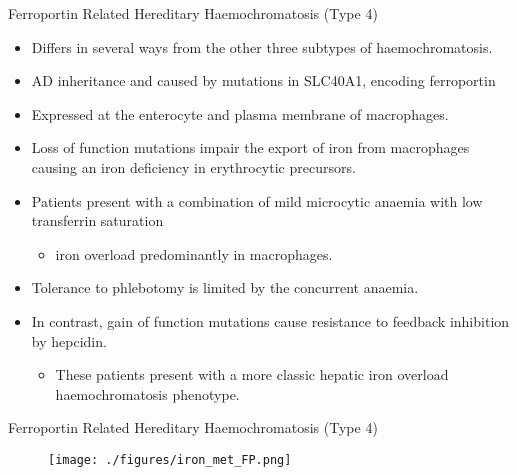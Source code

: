 \documentclass[presentation, smaller]{beamer}
\begin{document}
\begin{frame}[label={sec:orgbea8f45}]{Ferroportin Related Hereditary Haemochromatosis (Type 4)}
\begin{itemize}
\item Differs in several ways from the other three subtypes of haemochromatosis.
\item AD inheritance and caused by mutations in SLC40A1, encoding ferroportin
\item Expressed at the enterocyte and plasma membrane of macrophages.
\item Loss of function mutations impair the export of iron from macrophages causing an iron
deficiency in erythrocytic precursors.
\item Patients present with a combination of mild microcytic anaemia with
low transferrin saturation
\begin{itemize}
\item iron overload predominantly in macrophages.
\end{itemize}
\item Tolerance to phlebotomy is limited by the concurrent anaemia.
\item In contrast, gain of function mutations cause resistance to feedback
inhibition by hepcidin.
\begin{itemize}
\item These patients present with a more classic hepatic iron overload
haemochromatosis phenotype.
\end{itemize}
\end{itemize}
\end{frame}

\begin{frame}[label={sec:org0da7dc4}]{Ferroportin Related Hereditary Haemochromatosis (Type 4)}
\begin{figure}[htbp]
\centering
\texttt{[image: ./figures/iron\_met\_FP.png]}
\label{fig:orga70e841}
\end{figure}
\end{frame}
\end{document}
